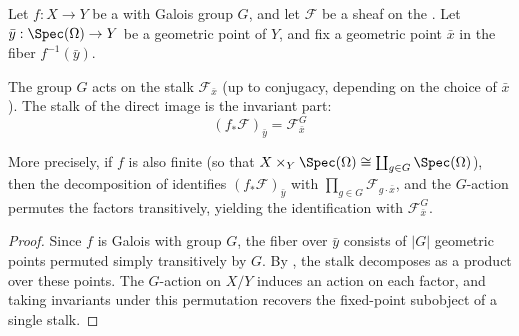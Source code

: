 \begin{proposition} \label{proposition:stalk_of_direct_image_under_Galois_morphism_etale_sheaf}
    Let $f : X \to Y$ be a  with Galois group $G$, and let $\mathcal{F}$ be a sheaf on the . Let $\bar{y} : \Spec(\Omega) \to Y$ be a geometric point of $Y$, and fix a geometric point $\bar{x}$ in the fiber $f^{-1}(\bar{y})$.

    The group $G$ acts on the stalk $\mathcal{F}_{\bar{x}}$ (up to conjugacy, depending on the choice of $\bar{x}$). The stalk of the direct image is the invariant part:
    $$(f_*\mathcal{F})_{\bar{y}} = \mathcal{F}_{\bar{x}}^{G}$$

    More precisely, if $f$ is also finite (so that $X \times_Y \Spec(\Omega) \cong \coprod_{g \in G} \Spec(\Omega)$), then the decomposition of  identifies $(f_*\mathcal{F})_{\bar{y}}$ with $\prod_{g \in G} \mathcal{F}_{g \cdot \bar{x}}$, and the $G$-action permutes the factors transitively, yielding the identification with $\mathcal{F}_{\bar{x}}^G$.
\end{proposition}
\begin{proof}
    Since $f$ is Galois with group $G$, the fiber over $\bar{y}$ consists of $|G|$ geometric points permuted simply transitively by $G$. By , the stalk decomposes as a product over these points. The $G$-action on $X/Y$ induces an action on each factor, and taking invariants under this permutation recovers the fixed-point subobject of a single stalk.
\end{proof}
